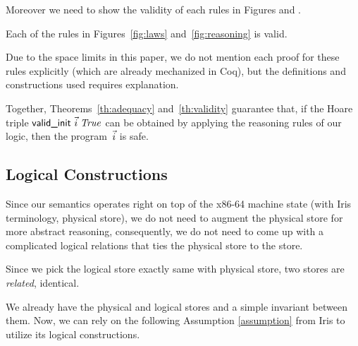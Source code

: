 Moreover we need to show the validity of each rules in Figures  and .
\begin{theorem}
\label{th:validity}
  Each of the rules in Figures~\ref{fig:laws}
  and~\ref{fig:reasoning} is valid.
\end{theorem}
Due to the space limits in this paper, we do not mention each proof for these rules explicitly (which are already mechanized in Coq),
but the definitions and constructions used requires explanation.

Together, Theorems~\ref{th:adequacy} and~\ref{th:validity} guarantee that, if
the Hoare triple $\textsf{valid\_init }\vec{i}\;\mathit{True}$ can be obtained by applying
the reasoning rules of our logic, then the program~$\vec{i}$ is safe.

\subsection{Logical Constructions}
\label{sec:invariant}

Since our semantics operates right on top of the x86-64 machine state (with Iris terminology, physical store),
we do not need to augment the physical store for more abstract reasoning, consequently, we do not need to come up
with a complicated logical relations that ties the physical store to the
\logical store. 
\begin{definition}
  \label{def:related}
  Since we pick the logical store exactly same with physical store,  
  two stores are \emph{related}, identical.
\end{definition}

We already have the physical and logical stores and a simple invariant between them. Now, we can rely on the following Assumption \ref{assumption} from Iris to utilize its logical constructions.
\newcommand{\genheapinterp}[1]{\mathit{Heap}\;#1}
\newcommand{\pred}[1]{\ownGhost\gammaPred{\authfull{(\mapone\predstore)}}}
\newcommand{\mapone}[1]{1.#1}
\newcommand{\mapsfromexact}[3]{
  \ownGhost\gammaPred{\authfrag{\singletonMap{#1}{(#2, #3)}}}
}
\newcommand{\sh}{L'}
\newcommand{\mapsfromdef}[3]{
  \exists\sh.\;
  \mapsfromexact{#1}{#2}{\sh} \star \pure{\sh \subseteq #3}
}


